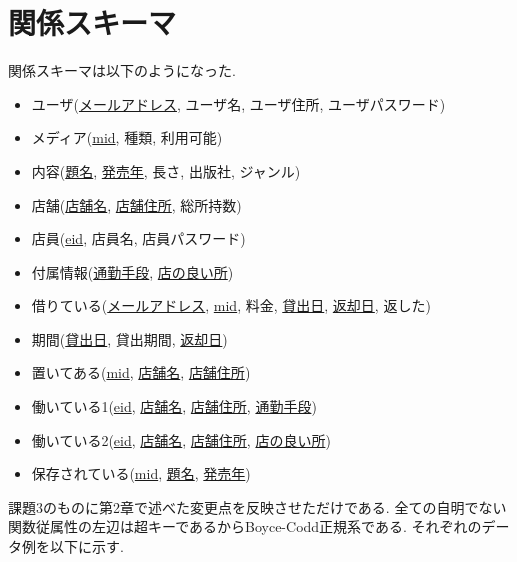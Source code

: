 \documentclass{jarticle}
\begin{document}
\section{関係スキーマ}
関係スキーマは以下のようになった.
\begin{itemize}
\item ユーザ(\underline{メールアドレス}, ユーザ名, ユーザ住所, ユーザパスワード)
\item メディア(\underline{mid}, 種類, 利用可能)
\item 内容(\underline{題名}, \underline{発売年}, 長さ, 出版社, ジャンル)
\item 店舗(\underline{店舗名}, \underline{店舗住所}, 総所持数)
\item 店員(\underline{eid}, 店員名, 店員パスワード)
\item 付属情報(\underline{通勤手段}, \underline{店の良い所})
\item 借りている(\underline{メールアドレス}, \underline{mid}, 料金, \underline{貸出日}, \underline{返却日}, 返した)
\item 期間(\underline{貸出日}, 貸出期間, \underline{返却日})
\item 置いてある(\underline{mid}, \underline{店舗名}, \underline{店舗住所})
\item 働いている1(\underline{eid}, \underline{店舗名}, \underline{店舗住所}, \underline{通勤手段})
\item 働いている2(\underline{eid}, \underline{店舗名}, \underline{店舗住所}, \underline{店の良い所})
\item 保存されている(\underline{mid}, \underline{題名}, \underline{発売年})
\end{itemize}
課題3のものに第2章で述べた変更点を反映させただけである. 全ての自明でない関数従属性の左辺は超キーであるからBoyce-Codd正規系である. それぞれのデータ例を以下に示す.
\end{document}

